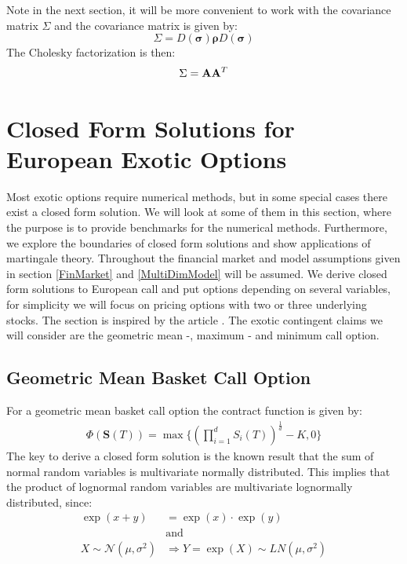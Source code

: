 Note in the next section, it will be more convenient to work with the covariance matrix $\Sigma$ and the covariance matrix is given by:
$$\Sigma=D(\bm{\sigma}) \bm{\rho} D(\bm{\sigma})$$
The Cholesky factorization is then:
$$\Sigma=\mathbf{A}\mathbf{A}^T$$

\newpage


\section{Closed Form Solutions for European Exotic Options}\label{ExoticEuro}
Most exotic options require numerical methods, but in some special cases there exist a closed form solution. We will look at some of them in this section, where the purpose is to provide benchmarks for the numerical methods. Furthermore, we explore the boundaries of closed form solutions and show applications of martingale theory. Throughout the financial market and model assumptions given in section \ref{FinMarket} and \ref{MultiDimModel} will be assumed. We derive closed form solutions to European call and put options depending on several variables, for simplicity we will focus on pricing options with two or three underlying stocks. The section is inspired by the article \parencite{Ouwehand2006}. The exotic contingent claims we will consider are the geometric mean -, maximum - and minimum call option.

\subsection{Geometric Mean Basket Call Option}\label{GeoBasket}
For a geometric mean basket call option the contract function is given by:
\begin{align*}
\Phi(\bm{S}(T))=\max\{ (\prod_{i=1}^{d} S_i(T))^{\frac{1}{d}}-K,0 \}
\end{align*}
The key to  derive a closed form solution is the known result that the sum of normal random variables is multivariate normally distributed.
This implies that the product of lognormal random variables are multivariate lognormally distributed, since: 
\begin{equation*}
\begin{split}
\exp(x+y)&=\exp(x)\cdot \exp(y) \\
& \text{and}\\
 X \sim \mathcal{N}(\mu,\sigma^2) & \Rightarrow Y = \exp(X)\sim LN(\mu, \sigma^2)
\end{split}
\end{equation*}

